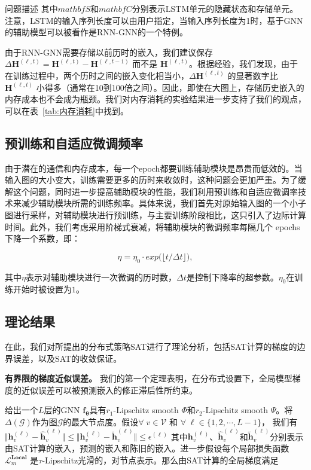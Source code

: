\begin{section}{问题描述}
    其中$mathbf{S}$和$mathbf{C}$分别表示LSTM单元的隐藏状态和存储单元。注意，LSTM的输入序列长度可以由用户指定，当输入序列长度为1时，基于GNN的辅助模型可以被看作是RNN-GNN的一个特例。

由于RNN-GNN需要存储以前历时的嵌入，我们建议保存$\Delta\mathbf{H}^{(\ell,t)}=\mathbf{H}^{(\ell,t)}-\mathbf{H}^{(\ell,t-1)}$  而不是 $\mathbf{H}^{(\ell,t)}$。根据经验，我们发现，由于在训练过程中，两个历时之间的嵌入变化相当小，$\Delta\mathbf{H}^{(\ell,t)}$ 的显著数字比$\mathbf{H}^{(\ell,t)}$ 小得多（通常在10到100倍之间）。因此，即使在大图上，存储历史嵌入的内存成本也不会成为瓶颈。我们对内存消耗的实验结果进一步支持了我们的观点，可以在表~\ref{tab:内存消耗}中找到。


\subsection{预训练和自适应微调频率}

由于潜在的通信和内存成本，每一个epoch都要训练辅助模块是昂贵而低效的。当输入图的大小变大，训练需要更多的历时来收敛时，这种问题会更加严重。为了缓解这个问题，同时进一步提高辅助模块的性能，我们利用预训练和自适应微调率技术来减少辅助模块所需的训练频率。具体来说，我们首先对原始输入图的一个小子图进行采样，对辅助模块进行预训练，与主要训练阶段相比，这只引入了边际计算时间。此外，我们考虑采用阶梯式衰减，将辅助模块的微调频率每隔几个 epochs下降一个系数，即：

\begin{equation}
    \eta =  \eta_0 \cdot exp\big( \lfloor t / \Delta t \rfloor\big),
\end{equation}

其中$\eta$表示对辅助模块进行一次微调的历时数，$\Delta t$是控制下降率的超参数。$\eta_0$在训练开始时被设置为$1$。

\subsection{理论结果}
在此，我们对所提出的分布式策略SAT进行了理论分析，包括SAT计算的梯度的边界误差，以及SAT的收敛保证。

\textbf{有界限的梯度近似误差。}
我们的第一个定理表明，在分布式设置下，全局模型梯度的近似误差可以被预测嵌入的修正滞后性所约束。

\begin{theorem}
    \label{thm:gradient error bound}
    给出一个$L$层的GNN $\boldsymbol{f}_{\boldsymbol{\theta}}$具有$r_1$-Lipschitz smooth $\Phi$和$r_2$-Lipschitz smooth $\Psi$。将$\Delta(\mathcal{G})$作为图$\mathcal{G}$的最大节点度。假设$\forall\; v\in\mathcal{V}$ 和 $\forall\; \ell\in\{1,2,\cdots,L-1\}$， 我们有 $\Vert \textbf{h}_{v}^{(\ell)} - \mathbf{\hat{h}}_{v}^{(\ell)} \Vert \leq \Vert \textbf{h}_{v}^{(\ell)} - \mathbf{\tilde{h}}_{v}^{(\ell)} \Vert \leq\epsilon^{(\ell)}$ 其中$\textbf{h}_{v}^{(\ell)}$、$\mathbf{\hat{h}}_{v}^{(\ell)}$和$\mathbf{\tilde{h}}_{v}^{(\ell)}$分别表示由SAT计算的嵌入，预测的嵌入和陈旧的嵌入。进一步假设每个局部损失函数$\mathcal{L}_{m}^{\textbf{Local}}$ 是$\tau$-Lipschitz光滑的，对节点表示。那么由SAT计算的全局梯度满足

    \end{theorem}

\end{section}
